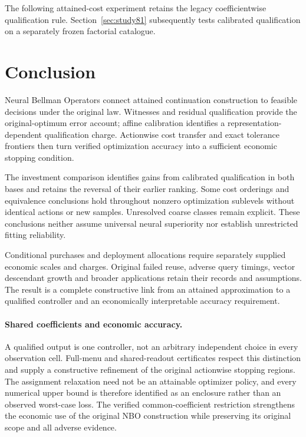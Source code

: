 \documentclass[ecta,nameyear,draft]{econsocart}
\begin{document}















\noindent The following attained-cost experiment retains the legacy coefficientwise qualification rule. Section~\ref{sec:study81} subsequently tests calibrated qualification on a separately frozen factorial catalogue.







\section{Conclusion}\label{sec:conclusion65}
Neural Bellman Operators connect attained continuation construction to feasible decisions under the original law. Witnesses and residual qualification provide the original-optimum error account; affine calibration identifies a representation-dependent qualification charge. Actionwise cost transfer and exact tolerance frontiers then turn verified optimization accuracy into a sufficient economic stopping condition.

The investment comparison identifies gains from calibrated qualification in both bases and retains the reversal of their earlier ranking. Some cost orderings and equivalence conclusions hold throughout nonzero optimization sublevels without identical actions or new samples. Unresolved coarse classes remain explicit. These conclusions neither assume universal neural superiority nor establish unrestricted fitting reliability.

Conditional purchases and deployment allocations require separately supplied economic scales and charges. Original failed reuse, adverse query timings, vector descendant growth and broader applications retain their records and assumptions. The result is a complete constructive link from an attained approximation to a qualified controller and an economically interpretable accuracy requirement.

\paragraph{Shared coefficients and economic accuracy.}
A qualified output is one controller, not an arbitrary independent choice in every observation cell. Full-menu and shared-readout certificates respect this distinction and supply a constructive refinement of the original actionwise stopping regions. The assignment relaxation need not be an attainable optimizer policy, and every numerical upper bound is therefore identified as an enclosure rather than an observed worst-case loss. The verified common-coefficient restriction strengthens the economic use of the original NBO construction while preserving its original scope and all adverse evidence.
\end{document}
